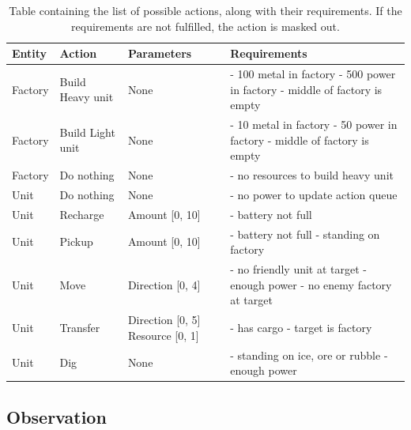 \begin{table}[htbp]
    \centering
    \begin{tabular}{p{1.5cm}|p{3cm}|p{3cm}|p{6cm}}
        \hline
        Entity & Action & Parameters & Requirements \\
        \hline
        Factory & Build Heavy unit & None & - 100 metal in factory \newline - 500 power in factory \newline - middle of factory is empty \\
        \hline
        Factory & Build Light unit & None & - 10 metal in factory \newline - 50 power in factory \newline - middle of factory is empty \\
        \hline
        Factory & Do nothing & None & - no resources to build heavy unit \\
        \hline
        Unit & Do nothing & None & - no power to update action queue \\
        \hline
        Unit & Recharge & Amount [0, 10] & - battery not full \\
        \hline
        Unit & Pickup & Amount [0, 10] & - battery not full \newline - standing on factory \\
        \hline
        Unit & Move & Direction [0, 4] & - no friendly unit at target \newline - enough power \newline - no enemy factory at target \\
        \hline
        Unit & Transfer & Direction [0, 5] \newline Resource [0, 1] & - has cargo \newline - target is factory \\
        \hline
        Unit & Dig & None & - standing on ice, ore or rubble \newline - enough power \\
        \hline
    \end{tabular}
    \captionsetup{justification=justified, singlelinecheck=false, width=1\linewidth, labelfont=bf}
    \caption{Table containing the list of possible actions, along with their requirements. If the requirements are not fulfilled, the action is masked out.}
    \label{tab:actions}
\end{table}


\subsection{Observation}

